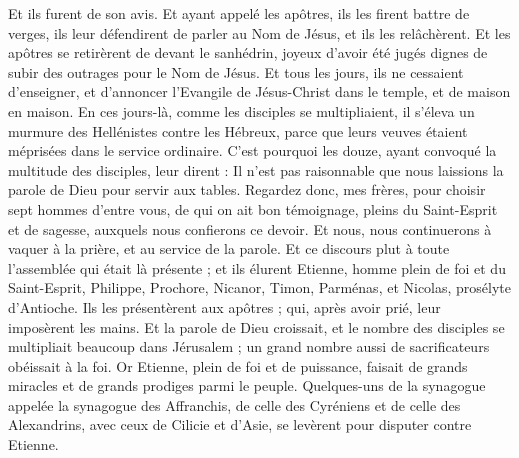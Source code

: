 \begin{multicols}{2}
{
Et ils furent de son avis. Et ayant appelé les apôtres, ils les firent battre de verges, ils leur défendirent de parler au Nom de Jésus, et ils les relâchèrent.
Et les apôtres se retirèrent de devant le sanhédrin, joyeux d'avoir été jugés dignes de subir des outrages pour le Nom de Jésus.
Et tous les jours, ils ne cessaient d'enseigner, et d'annoncer l'Evangile de Jésus-Christ dans le temple, et de maison en maison.
\VerseOne{}En ces jours-là, comme les disciples se multipliaient, il s'éleva un murmure des Hellénistes contre les Hébreux, parce que leurs veuves étaient méprisées dans le service ordinaire.
C'est pourquoi les douze, ayant convoqué la multitude des disciples, leur dirent : Il n'est pas raisonnable que nous laissions la parole de Dieu pour servir aux tables.
Regardez donc, mes frères, pour choisir sept hommes d'entre vous, de qui on ait bon témoignage, pleins du Saint-Esprit et de sagesse, auxquels nous confierons ce devoir.
Et nous, nous continuerons à vaquer à la prière, et au service de la parole.
Et ce discours plut à toute l'assemblée qui était là présente ; et ils élurent Etienne, homme plein de foi et du Saint-Esprit, Philippe, Prochore, Nicanor, Timon, Parménas, et Nicolas, prosélyte d'Antioche.
Ils les présentèrent aux apôtres ; qui, après avoir prié, leur imposèrent les mains.
Et la parole de Dieu croissait, et le nombre des disciples se multipliait beaucoup dans Jérusalem ; un grand nombre aussi de sacrificateurs obéissait à la foi.
Or Etienne, plein de foi et de puissance, faisait de grands miracles et de grands prodiges parmi le peuple.
Quelques-uns de la synagogue appelée la synagogue des Affranchis, de celle des Cyréniens et de celle des Alexandrins, avec ceux de Cilicie et d'Asie, se levèrent pour disputer contre Etienne.
}
\end{multicols}
